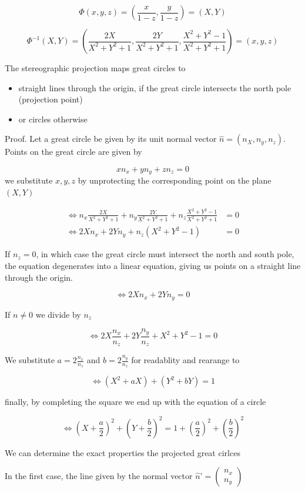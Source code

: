 \[\Phi(x,y,z) = \left(\frac{x}{1-z}, \frac{y}{1-z}\right) = (X, Y)\]

\[\Phi^{-1}(X, Y) = \left(\frac{2X}{X^2+Y^2+1}, \frac{2Y}{X^2+Y^2+1}, \frac{X^2 + Y^2 - 1}{X^2+Y^2+1}\right)= (x,y,z)\]

The stereographic projection maps great circles to

\begin{itemize}
\tightlist
\item
  straight lines through the origin, if the great circle intersects the
  north pole (projection point)
\item
  or circles otherwise
\end{itemize}

Proof. Let a great circle be given by its unit normal vector
\(\hat n = (n_X, n_y, n_z)\). Points on the great circle are given by

\[xn_x + yn_y + zn_z = 0\] we substitute \(x,y,z\) by unprotecting the
corresponding point on the plane \((X,Y)\)

\[\begin{split}
\Leftrightarrow 
n_x\frac{2X}{X^2+Y^2+1} + n_y\frac{2Y}{X^2+Y^2+1} + n_z\frac{X^2 + Y^2 - 1}{X^2+Y^2+1}&=0 \\[1em]
\Leftrightarrow
2Xn_x + 2Yn_y + n_z(X^2 + Y^2 - 1) &=0
\end{split}\]

If \(n_z = 0\), in which case the great circle must intersect the north
and south pole, the equation degenerates into a linear equation, giving
us points on a straight line through the origin.

\[\Leftrightarrow 2Xn_x + 2Yn_y = 0\]

If \(n \not= 0\) we divide by \(n_z\)

\[\Leftrightarrow 2X\frac{n_x}{n_z}+2Y\frac{n_y}{n_z} + X^2 + Y^2 - 1 = 0\]

We substitute \(a = 2\frac{n_x}{n_z}\) and \(b = 2\frac{n_y}{n_z}\) for
readablity and rearange to

\[\Leftrightarrow (X^2 + aX) + (Y^2 + bY) = 1\]

finally, by completing the square we end up with the equation of a
circle

\[\Leftrightarrow \left(X + \frac{a}{2} \right)^2 + \left(Y + \frac{b}{2}\right)^2 = 1 + \left(\frac{a}{2}\right)^2 + \left(\frac{b}{2}\right)^2\]

We can determine the exact properties the projected great cirlces

In the first case, the line given by the normal vector
\(\hat n’ = \begin{pmatrix}n_x\\ n_y\end{pmatrix}\)

